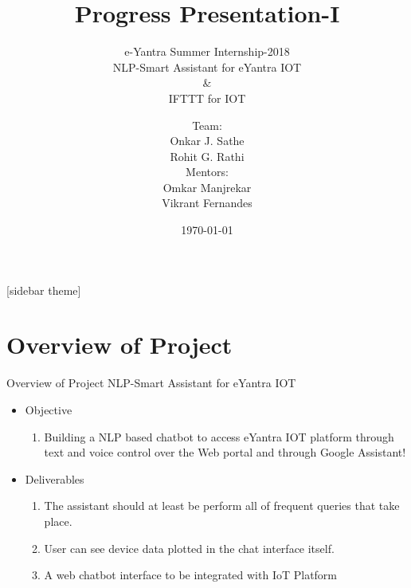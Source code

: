 \documentclass[10pt, a4paper]{beamer}
\begin{document}
	\title{Progress Presentation-I}
	\subtitle{e-Yantra Summer Internship-2018
	\newline
	\\ NLP-Smart Assistant for eYantra IOT
	\\\&
	\\IFTTT for IOT}
	\author{
	Team:
	\\Onkar J. Sathe
	\\Rohit G. Rathi
	\\Mentors:
	\\Omkar Manjrekar
	\\Vikrant Fernandes}
	\date{\today}
	\frame{\titlepage}

[sidebar theme]
\section{Overview of Project}
\begin{frame}{Overview of Project}
	NLP-Smart Assistant for eYantra IOT
	\begin{itemize}
		\item Objective
		\begin{enumerate}	
			\item Building a NLP based chatbot to access eYantra IOT platform  through text and voice control over the Web portal and through Google Assistant!
		\end{enumerate}
		\item Deliverables 
		\begin{enumerate}
			\item The assistant should at least be perform all of frequent queries that take place.
			\item User can see device data plotted in the chat interface itself.
			\item A web chatbot interface to be integrated with IoT Platform
		\end{enumerate}
	\end{itemize}
\end{frame}
\end{document}
